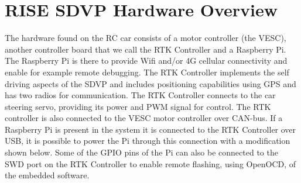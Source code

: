 \documentclass[12pt]{article} %
\begin{document}
\section{RISE SDVP Hardware Overview} 

The hardware found on the RC car consists of a motor controller (the
VESC), another controller board that we call the RTK Controller and a
Raspberry Pi.  The Raspberry Pi is there to provide Wifi and/or 4G
cellular connectivity and enable for example remote debugging. The RTK
Controller implements the self driving aspects of the SDVP and
includes positioning capabilities using GPS and has two radios for
communication. The RTK Controller connects to the car steering servo,
providing its power and PWM signal for control. The RTK controller is
also connected to the VESC motor controller over CAN-bus. If a
Raspberry Pi is present in the system it is connected to the RTK
Controller over USB, it is possible to power the Pi through this
connection with a modification shown below. Some of the GPIO pins of
the Pi can also be connected to the SWD port on the RTK Controller to
enable remote flashing, using OpenOCD, of the embedded software.

\vspace{5mm}
\end{document}
